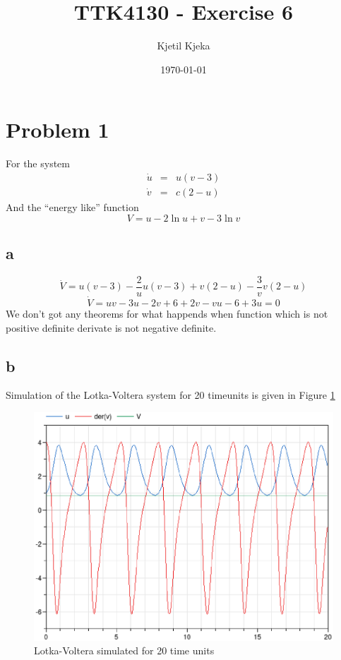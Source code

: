 \documentclass[11pt]{article}
\author{Kjetil Kjeka}
\title{TTK4130 - Exercise 6}
\date{\today}
\begin{document}
\maketitle
\section*{Problem 1}
For the system
\begin{eqnarray*}
\dot{u} &=& u (v-3) \\
\dot{v} &=& c (2-u)
\end{eqnarray*}
And the ``energy like'' function
\[V = u - 2 \ln{u} + v - 3 \ln{v} \]
\subsection*{a}
\[\dot{V} = u(v-3) - \frac{2}{u} u(v-3) + v(2-u) - \frac{3}{v} v(2-u) \]
\[\dot{V} = uv - 3u - 2v + 6 + 2v -vu - 6 + 3u = 0 \]
We don't got any theorems for what happends when function which is not positive definite derivate is not negative definite.

\subsection*{b}
Simulation of the Lotka-Voltera system for 20 timeunits is given in Figure \ref{fig:LotkaVoltera}
\begin{figure}[h]
\centering
\includegraphics[width=.8\textwidth]{LotkaVoltera.eps}
\caption{Lotka-Voltera simulated for 20 time units}
\label{fig:LotkaVoltera}
\end{figure}
\end{document}
